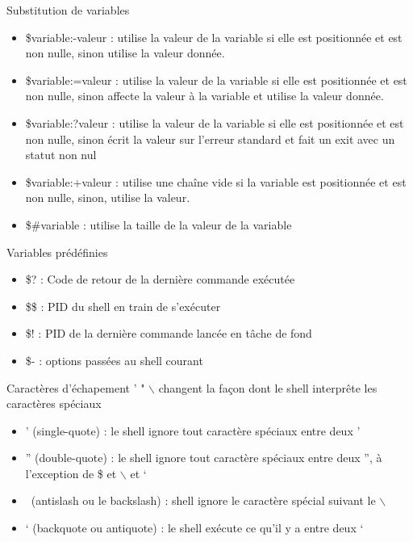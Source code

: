 \documentclass[10pt]{beamer}
\begin{document}
\begin{frame}{Substitution de variables}
\begin{itemize}
\item \alert{\${variable:-valeur}} : utilise la valeur de la variable si elle est positionnée et est non nulle, sinon utilise la valeur donnée.
 \item \alert{\${variable:=valeur}} : utilise la valeur de la variable si elle est positionnée et est non nulle, sinon affecte la valeur à la variable et utilise la valeur donnée.
 \item \alert{\${variable:?valeur}} : utilise la valeur de la variable si elle est positionnée et est non nulle, sinon écrit la valeur sur l’erreur standard et fait un exit avec un statut non nul
 \item \alert{\${variable:+valeur}} : utilise une chaîne vide si la variable est positionnée et est non nulle, sinon, utilise la valeur.
 \item \alert{\${\#variable}} : utilise la taille de la valeur de la variable
\end{itemize}
\end{frame}


 \begin{frame}{Variables prédéfinies}
 
 \begin{itemize}
 \item \alert{\$?} : Code de retour de la dernière commande exécutée
 \item \alert{\$\$} : PID du shell en train de s’exécuter
 \item \alert{\$!} : PID de la dernière commande lancée en tâche de fond 
 \item \alert{\$-} : options passées au shell courant
 \end{itemize}
 \end{frame}

\begin{frame}{Caractères d'échapement}
’ " $\backslash$ changent la façon dont le shell interprête les caractères spéciaux
\begin{itemize}
\item \alert{’ (single-quote)} : le shell ignore tout caractère spéciaux entre deux ’
\item \alert{” (double-quote)} : le shell ignore tout caractère spéciaux entre deux ”, à l’exception de \$ et $\backslash$ et ‘
\item \alert{\ (antislash ou le backslash)} : shell ignore le caractère spécial suivant le $\backslash$
\item \alert{‘ (backquote ou antiquote)} : le shell exécute ce qu’il y a entre deux ‘
\end{itemize}
\end{frame}
\end{document}
